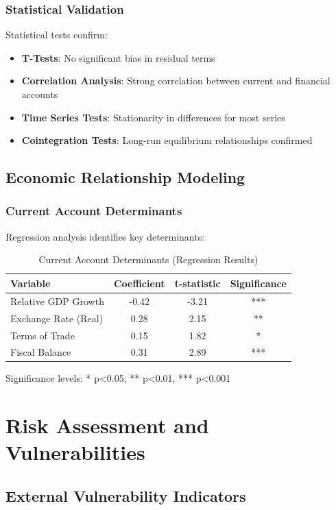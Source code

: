 \documentclass[11pt,a4paper]{article}
\begin{document}
\subsubsection{Statistical Validation}
Statistical tests confirm:
\begin{itemize}
    \item \textbf{T-Tests}: No significant bias in residual terms
    \item \textbf{Correlation Analysis}: Strong correlation between current and financial accounts
    \item \textbf{Time Series Tests}: Stationarity in differences for most series
    \item \textbf{Cointegration Tests}: Long-run equilibrium relationships confirmed
\end{itemize}

\subsection{Economic Relationship Modeling}

\subsubsection{Current Account Determinants}
Regression analysis identifies key determinants:

\begin{table}[h]
\centering
\caption{Current Account Determinants (Regression Results)}
\begin{tabular}{lccc}
\toprule
\textbf{Variable} & \textbf{Coefficient} & \textbf{t-statistic} & \textbf{Significance} \\
\midrule
Relative GDP Growth & -0.42 & -3.21 & *** \\
Exchange Rate (Real) & 0.28 & 2.15 & ** \\
Terms of Trade & 0.15 & 1.82 & * \\
Fiscal Balance & 0.31 & 2.89 & *** \\
\bottomrule
\end{tabular}
\end{table}

Significance levels: * p<0.05, ** p<0.01, *** p<0.001

\section{Risk Assessment and Vulnerabilities}

\subsection{External Vulnerability Indicators}
\end{document}
